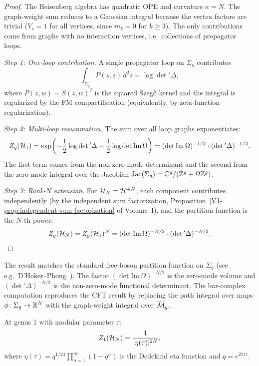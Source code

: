 \begin{proof}
The Heisenberg algebra has quadratic OPE and curvature $\kappa = N$.
The graph-weight sum reduces to a Gaussian integral because the
vertex factors are trivial ($V_v = 1$ for all vertices, since $m_k = 0$
for $k \geq 3$). The only contributions come from graphs with no
interaction vertices, i.e.\ collections of propagator loops.

\emph{Step 1: One-loop contribution.} A single propagator loop on
$\Sigma_g$ contributes
\[
\int_{\Sigma_g} P(z, z)\, d^2 z = \log \det{}' \Delta,
\]
where $P(z, w) = S(z, w)^2$ is the squared Szeg\H{o} kernel and the
integral is regularized by the FM compactification (equivalently, by
zeta-function regularization).

\emph{Step 2: Multi-loop resummation.} The sum over all loop graphs
exponentiates:
\[
Z_g(\mathcal{H}_1)
 = \exp\!\left(-\frac{1}{2} \log \det{}' \Delta
 - \frac{1}{2} \log \det \mathrm{Im}\, \Omega\right)
 = (\det \mathrm{Im}\, \Omega)^{-1/2}
 \cdot (\det{}' \Delta)^{-1/2}.
\]
The first term comes from the non-zero-mode determinant and the second
from the zero-mode integral over the Jacobian $\mathrm{Jac}(\Sigma_g)
= \mathbb{C}^g / (\mathbb{Z}^g + \Omega \mathbb{Z}^g)$.

\emph{Step 3: Rank-$N$ extension.} For $\mathcal{H}_N = \mathcal{H}^{\oplus N}$,
each component contributes independently (by the independent sum
factorization, Proposition~\ref*{V1-prop:independent-sum-factorization}
of Volume~I), and the partition function is the $N$-th power:
\[
Z_g(\mathcal{H}_N) = Z_g(\mathcal{H}_1)^N
 = (\det \mathrm{Im}\, \Omega)^{-N/2}
 \cdot (\det{}' \Delta)^{-N/2}.
\]
\end{proof}

\begin{remark}
The result matches the standard free-boson partition function on
$\Sigma_g$ (see e.g.\ D'Hoker--Phong~\cite{DhokerPhong}). The factor
$(\det \mathrm{Im}\, \Omega)^{-N/2}$ is the zero-mode volume and
$(\det{}' \Delta)^{-N/2}$ is the non-zero-mode functional determinant.
The bar-complex computation reproduces the CFT result by
replacing the path integral over maps $\phi \colon \Sigma_g \to \mathbb{R}^N$
with the graph-weight integral over $\overline{\mathcal{M}}_g$.
\end{remark}

\begin{corollary}
At genus 1 with modular parameter $\tau$:
\[
Z_1(\mathcal{H}_N) = \frac{1}{|\eta(\tau)|^{2N}},
\]
where $\eta(\tau) = q^{1/24} \prod_{n=1}^{\infty} (1 - q^n)$ is the
Dedekind eta function and $q = e^{2\pi i \tau}$.
\end{corollary}


